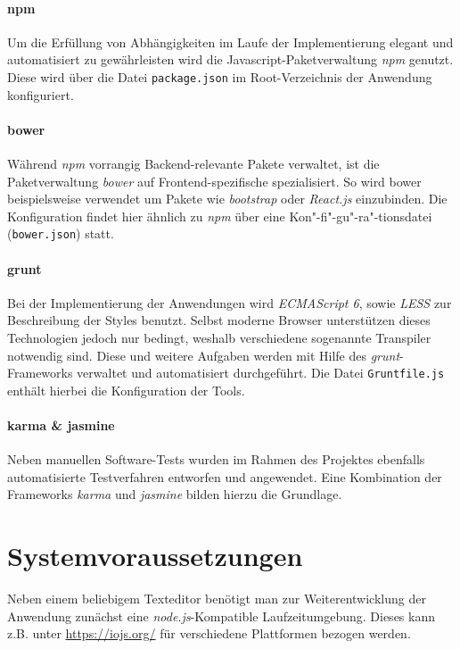 \paragraph{npm}
Um die Erfüllung von Abhängigkeiten im Laufe der Implementierung elegant und automatisiert zu gewährleisten wird die Javascript-Paketverwaltung \textit{npm} genutzt.
Diese wird über die Datei \texttt{package.json} im Root-Verzeichnis der Anwendung konfiguriert.

\paragraph{bower}
Während \textit{npm} vorrangig Backend-relevante Pakete verwaltet, ist die Paketverwaltung \textit{bower} auf Frontend-spezifische spezialisiert.
So wird bower beispielsweise verwendet um Pakete wie \textit{bootstrap} oder \textit{React.js} einzubinden.
Die Konfiguration findet hier ähnlich zu \textit{npm} über eine Kon"-fi"-gu"-ra"-tionsdatei (\texttt{bower.json}) statt.

\paragraph{grunt}
Bei der Implementierung der Anwendungen wird \textit{ECMAScript 6}, sowie \textit{LESS} zur Beschreibung der Styles benutzt.
Selbst moderne Browser unterstützen dieses Technologien jedoch nur bedingt, weshalb verschiedene sogenannte Transpiler notwendig sind.
Diese und weitere Aufgaben werden mit Hilfe des \textit{grunt}-Frameworks verwaltet und automatisiert durchgeführt.
Die Datei \texttt{Gruntfile.js} enthält hierbei die Konfiguration der Tools.

\paragraph{karma \& jasmine}
Neben manuellen Software-Tests wurden im Rahmen des Projektes ebenfalls automatisierte Testverfahren entworfen und angewendet.
Eine Kombination der Frameworks \textit{karma} und \textit{jasmine} bilden hierzu die Grundlage.


\section{Systemvoraussetzungen}
Neben einem beliebigem Texteditor benötigt man zur Weiterentwicklung der Anwendung zunächst eine \textit{node.js}-Kompatible Laufzeitumgebung. Dieses kann z.B. unter \url{https://iojs.org/} für verschiedene Plattformen bezogen werden.

